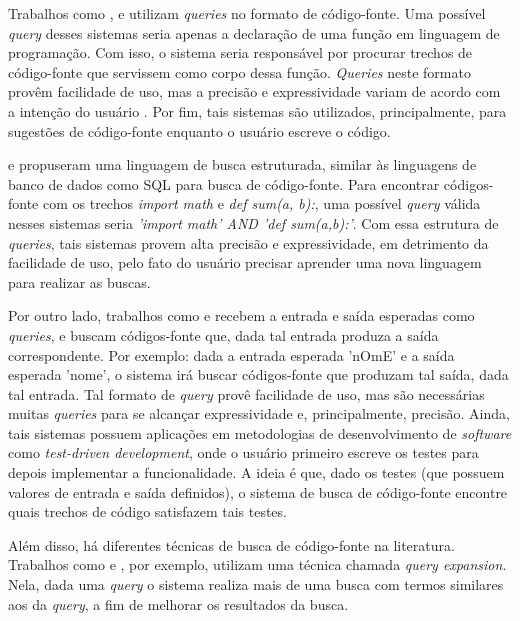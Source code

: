 Trabalhos como \textcite{Zhou2018SLAMPARC}, \textcite{Fujiwara2019CodetoCodeSB} e \textcite{Mukherjee2020SearchingAD} utilizam \textit{queries} no formato de código-fonte. Uma possível \textit{query} desses sistemas seria apenas a declaração de uma função em linguagem de programação. Com isso, o sistema seria responsável por procurar trechos de código-fonte que servissem como corpo dessa função. \textit{Queries} neste formato provêm facilidade de uso, mas a precisão e expressividade variam de acordo com a intenção do usuário \cite{Grazia2022CodeSA}. Por fim, tais sistemas são utilizados, principalmente, para sugestões de código-fonte enquanto o usuário escreve o código.

\textcite{Martie2015CodeExchangeSR} e \textcite{Sivaraman2019ActiveIL} propuseram uma linguagem de busca estruturada, similar às linguagens de banco de dados como SQL para busca de código-fonte. Para encontrar códigos-fonte com os trechos \textit{import math} e \textit{def sum(a, b):}, uma possível \textit{query} válida nesses sistemas seria \textit{'import math' AND 'def sum(a,b):'}. Com essa estrutura de \textit{queries}, tais sistemas provem alta precisão e expressividade, em detrimento da facilidade de uso, pelo fato do usuário precisar aprender uma nova linguagem para realizar as buscas.

Por outro lado, trabalhos como \textcite{Reiss2009SemanticsbasedCS} e \textcite{Jiang2018ResearchPS} recebem a entrada e saída esperadas como \textit{queries}, e buscam códigos-fonte que, dada tal entrada produza a saída correspondente. Por exemplo: dada a entrada esperada 'nOmE' e a saída esperada 'nome', o sistema irá buscar códigos-fonte que produzam tal saída, dada tal entrada. Tal formato de \textit{query} provê facilidade de uso, mas são necessárias muitas \textit{queries} para se alcançar expressividade e, principalmente, precisão. Ainda, tais sistemas possuem aplicações em metodologias de desenvolvimento de \textit{software} como \textit{test-driven development}, onde o usuário primeiro escreve os testes para depois implementar a funcionalidade. A ideia é que, dado os testes (que possuem valores de entrada e saída definidos), o sistema de busca de código-fonte encontre quais trechos de código satisfazem tais testes.

Além disso, há diferentes técnicas de busca de código-fonte na literatura. Trabalhos como \textcite{Lu2015QueryEV} e \textcite{Li2016RelationshipawareCS}, por exemplo, utilizam uma técnica chamada \textit{query expansion}. Nela, dada uma \textit{query} o sistema realiza mais de uma busca com termos similares aos da \textit{query}, a fim de melhorar os resultados da busca. 


